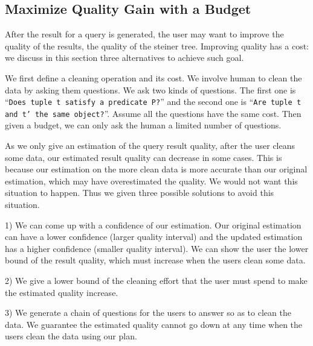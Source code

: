 \subsection{Maximize Quality Gain with a Budget}\label{subsec:gain}

After the result for a query is generated, the user may want to improve the
quality of the results, \ie the quality of the steiner tree. Improving quality
has a cost: we discuss in this section three alternatives to achieve such goal.

We first define a cleaning operation and its cost. We involve human to clean the
data by asking them questions. We ask two kinds of questions. The first one is
``\texttt{Does tuple t satisfy a predicate P?}'' and the second one is
``\texttt{Are tuple t and t' the same object?}''. Assume all the questions have
the same cost. Then given a budget, we can only ask the human a limited number
of questions.

As we only give an estimation of the query result quality, after the user cleans
some data, our estimated result quality can decrease in some cases. This is
because our estimation on the more clean data is more accurate than our original
estimation, which may have overestimated the quality. We would not want this
situation to happen. Thus we given three possible solutions to avoid this
situation. 

1) We can come up with a confidence of our estimation. Our original estimation
can have a lower confidence (larger quality interval) and the updated estimation
has a higher confidence (smaller quality interval). We can show the user the
lower bound of the result quality, which must increase when the users clean some
data.

2) We give a lower bound of the cleaning effort that the user must spend to make
the estimated quality increase.

3) We generate a chain of questions for the users to answer so as to clean the
data. We guarantee the estimated quality cannot go down at any time when the
users clean the data using our plan.

